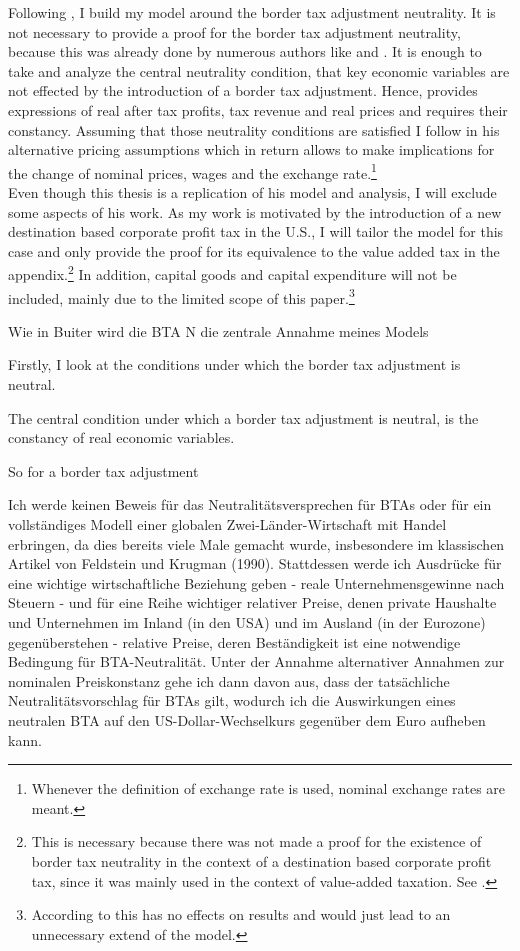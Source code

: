 Following \cite{buiter2017exchange}, I build my model around the border tax adjustment neutrality. It is not necessary to provide a proof for the border tax adjustment neutrality, because this was already done by numerous authors like \cite{Feldstein&Krugman} and \cite{grossman1980border}. It is enough to take and analyze the central neutrality condition, that key economic variables are not effected by the introduction of a border tax adjustment. Hence, \cite{buiter2017exchange} provides expressions of real after tax profits, tax revenue and real prices and requires their constancy. Assuming that those neutrality conditions are satisfied I follow \cite{buiter2017exchange} in his alternative pricing assumptions which in return allows to make implications for the change of nominal prices, wages and the exchange rate.\footnote{Whenever the definition of exchange rate is used, nominal exchange rates are meant.} ~\\ Even though this thesis is a replication of his model and analysis, I will exclude some aspects of his work. As my work is motivated by the introduction of a new destination based corporate profit tax in the U.S., I will tailor the model for this case and only provide the proof for its equivalence to the value added tax in the appendix.\footnote{This is necessary because there was not made a proof for the existence of border tax neutrality in the context of a destination based corporate profit tax, since it was mainly used in the context of value-added taxation. See \cite{Feldstein&Krugman}. } In addition, capital goods and capital expenditure will not be included, mainly due to the limited scope of this paper.\footnote{According to \cite{buiter2017exchange} this has no effects on results and would just lead to an unnecessary extend of the model.} 

Wie in Buiter wird die BTA N die zentrale Annahme meines Models

Firstly, I look at the conditions under which the border tax adjustment is neutral. 

The central condition under which a border tax adjustment is neutral, is the constancy of real economic variables. 

So for a border tax adjustment 

Ich werde keinen Beweis für das Neutralitätsversprechen für BTAs oder für ein vollständiges Modell einer globalen Zwei-Länder-Wirtschaft mit Handel erbringen, da dies bereits viele Male gemacht wurde, insbesondere im klassischen Artikel von Feldstein und Krugman (1990). Stattdessen werde ich Ausdrücke für eine wichtige wirtschaftliche Beziehung geben - reale Unternehmensgewinne nach Steuern - und für eine Reihe wichtiger relativer Preise, denen private Haushalte und Unternehmen im Inland (in den USA) und im Ausland (in der Eurozone) gegenüberstehen - relative Preise, deren Beständigkeit ist eine notwendige Bedingung für BTA-Neutralität. Unter der Annahme alternativer Annahmen zur nominalen Preiskonstanz gehe ich dann davon aus, dass der tatsächliche Neutralitätsvorschlag für BTAs gilt, wodurch ich die Auswirkungen eines neutralen BTA auf den US-Dollar-Wechselkurs gegenüber dem Euro aufheben kann.

